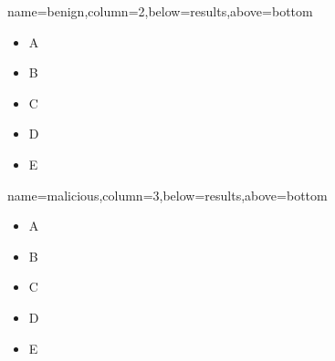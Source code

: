 \documentclass[landscape,specialSize,fontscale=0.3]{baposter}
\begin{document}
\begin{poster}
    {name=benign,column=2,below=results,above=bottom}{
  \begin{itemize}\item A \item B \item C \item D \item E\end{itemize}
}

    {name=malicious,column=3,below=results,above=bottom}{
  \begin{itemize}\item A \item B \item C \item D \item E\end{itemize}
}

\end{poster}
\end{document}
